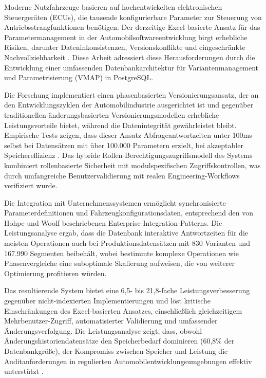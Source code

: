 Moderne Nutzfahrzeuge basieren auf hochentwickelten elektronischen Steuergeräten (ECUs), die tausende konfigurierbare Parameter zur Steuerung von Antriebsstrangfunktionen benötigen. Der derzeitige Excel-basierte Ansatz für das Parametermanagement in der Automobilsoftwareentwicklung birgt erhebliche Risiken, darunter Dateninkonsistenzen, Versionskonflikte und eingeschränkte Nachvollziehbarkeit \cite{trovao2024evolution}. Diese Arbeit adressiert diese Herausforderungen durch die Entwicklung einer umfassenden Datenbankarchitektur für Variantenmanagement und Parametrisierung (VMAP) in PostgreSQL.
	
Die Forschung implementiert einen phasenbasierten Versionierungsansatz, der an den Entwicklungszyklen der Automobilindustrie ausgerichtet ist und gegenüber traditionellen änderungsbasierten Versionierungsmodellen erhebliche Leistungsvorteile bietet, während die Datenintegrität gewährleistet bleibt. Empirische Tests zeigen, dass dieser Ansatz Abfrageantwortzeiten unter 100ms selbst bei Datensätzen mit über 100.000 Parametern erzielt, bei akzeptabler Speichereffizienz \cite{bhattacherjee2015principles}. Das hybride Rollen-Berechtigungszugriffsmodell des Systems kombiniert rollenbasierte Sicherheit mit modulspezifischen Zugriffskontrollen, was durch umfangreiche Benutzervalidierung mit realen Engineering-Workflows verifiziert wurde.
	
Die Integration mit Unternehmenssystemen ermöglicht synchronisierte Parameterdefinitionen und Fahrzeugkonfigurationsdaten, entsprechend den von Hohpe und Woolf \cite{hohpe2002enterprise} beschriebenen Enterprise-Integration-Patterns. Die Leistungsanalyse ergab, dass die Datenbank interaktive Antwortzeiten für die meisten Operationen auch bei Produktionsdatensätzen mit 830 Varianten und 167.990 Segmenten beibehält, wobei bestimmte komplexe Operationen wie Phasenvergleiche eine suboptimale Skalierung aufweisen, die von weiterer Optimierung profitieren würden.
	
Das resultierende System bietet eine 6,5- bis 21,8-fache Leistungsverbesserung gegenüber nicht-indexierten Implementierungen und löst kritische Einschränkungen des Excel-basierten Ansatzes, einschließlich gleichzeitigem Mehrbenutzer-Zugriff, automatisierter Validierung und umfassender Änderungsverfolgung. Die Leistungsanalyse zeigt, dass, obwohl Änderungshistoriendatensätze den Speicherbedarf dominieren (60,8\% der Datenbankgröße), der Kompromiss zwischen Speicher und Leistung die Auditanforderungen in regulierten Automobilentwicklungsumgebungen effektiv unterstützt \cite{staron2021automotive}.









\newpage
\makeatletter
	\if@twoside%
   		\cleardoublepage
   		
	\else%
	\fi%
\makeatother